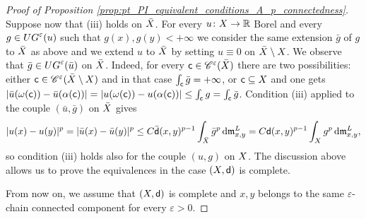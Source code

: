 \documentclass[12pt]{amsart}
\newcommand{\R}{\mathbb{R}}
\newcommand{\sfd}{{\sf d}}
\renewcommand{\d}{{\mathrm d}}
\newcommand{\X}{{\rm X}}
\newcommand{\mm}{\mathfrak m}
\theoremstyle{definition}
\newcommand{\sfc}{{\sf c}}
\newcommand{\Chain}[1]{\mathscr{C}^{#1}}
\newcommand{\UG}[1]{{\rm UG}^{#1}}
\begin{document}
\begin{proof}[Proof of Proposition \ref{prop:pt_PI_equivalent_conditions_A_p_connectedness}]
    Suppose now that (iii) holds on $\bar{\X}$. For every $u \colon \X \to \R$ Borel and every $g\in \UG{\varepsilon}(u)$ such that $g(x),g(y) < +\infty$ we consider the same extension $\bar{g}$ of $g$ to $\bar{\X}$ as above and we extend $u$ to $\bar{\X}$ by setting $u \equiv 0$ on $\bar{\X} \setminus \X$. 
    We observe that $\bar{g} \in \UG{\varepsilon}(\bar{u})$ on $\bar{\X}$. Indeed, for every $\sfc \in \Chain{\varepsilon}(\bar{\X})$ there are two possibilities: either $\sfc \in \Chain{\varepsilon}(\bar{\X}\setminus \X)$ and in that case $\int_\sfc \bar{g} = +\infty$, or $\sfc \subseteq \X$ and one gets $\vert \bar{u}(\omega(\sfc)) - \bar{u}(\alpha(\sfc))\vert = \vert u(\omega(\sfc)) - u(\alpha(\sfc))\vert \le \int_\sfc g = \int_{\sfc}\bar{g}$. Condition (iii) applied to the couple $(\bar{u}, \bar{g})$ on $\bar{\X}$ gives
    \begin{equation}
        \begin{aligned}
            \vert u(x) - u(y) \vert^p = \vert \bar{u}(x) - \bar{u}(y) \vert^p \le C\bar{\sfd}(x,y)^{p-1}\int_{\bar{\X}} \bar{g}^p \,\d\mm_{x,y}^L = C\sfd(x,y)^{p-1}\int_{\X} g^p \,\d\mm_{x,y}^L,
        \end{aligned}
    \end{equation}
    so condition (iii) holds also for the couple $(u,g)$ on $\X$. The discussion above allows us to prove the equivalences in the case $(\X,\sfd)$ is complete. 

    From now on, we assume that $(\X,\sfd)$ is complete and $x,y$ belongs to the same $\varepsilon$-chain connected component for every $\varepsilon>0$.
    

\end{proof}
\end{document}
